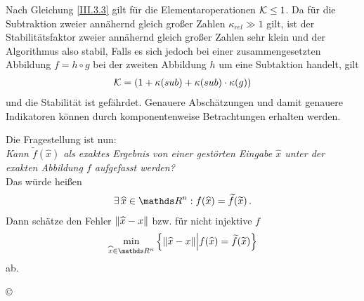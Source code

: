 \begin{Bspe}
  Nach Gleichung \eqref{III.3.3} gilt für die Elementaroperationen $\mathcal{K}\leq 1$.
  Da für die Subtraktion zweier annähernd gleich großer Zahlen $\kappa_{rel}\gg 1$ gilt,
  ist der Stabilitätsfaktor zweier annähernd gleich großer
  Zahlen sehr klein und der Algorithmus also stabil,
  Falls es sich jedoch bei einer zusammengesetzten Abbildung $f=h\circ g$
  bei der zweiten Abbildung $h$ um eine Subtaktion handelt, gilt
  \begin{gather*}
    \mathcal{K} =(1+\kappa(sub)+\kappa(sub)\cdot\kappa(g))
  \end{gather*}
  und die Stabilität ist gefährdet.
  Genauere Abschätzungen und damit genauere Indikatoren
  können durch komponentenweise Betrachtungen erhalten werden.
\end{Bspe}


 
Die Fragestellung ist nun: \\
\textit{Kann $\widetilde{f}(\widehat{x})$ als exaktes Ergebnis von einer gestörten Eingabe $\widehat{x}$ unter der exakten Abbildung $f$ aufgefasst werden?}\\
Das würde heißen
\begin{gather*}
  \exists\, \widehat{x}\in \Ren: f(\widehat{x})= \widetilde{f}(\widetilde{x}) \, .
\end{gather*}
Dann schätze den Fehler $ \left\| \widehat{x}-x \right\|$
bzw. für nicht injektive $f$
\begin{gather*}
  \min_{\widehat{x}\in \Ren}
  \left\{
    \nn{\widehat{x}-x} 
    \middle\vert f(\widehat{x}) = \widetilde{f}(\widetilde{x}) 
  \right\}
\end{gather*} 
ab. 

\begin{image}{\copyright}
\end{image}

